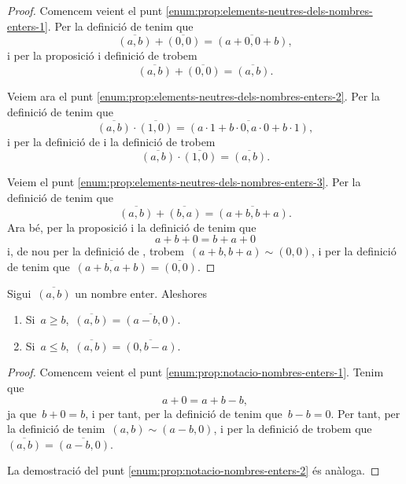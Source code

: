 \documentclass[../../main.tex]{subfiles}
\begin{document}
    \begin{proof}
        Comencem veient el punt \eqref{enum:prop:elements-neutres-dels-nombres-enters-1}.
        Per la definició de  tenim que
        \[
            \overline{(a,b)}+\overline{(0,0)}=\overline{(a+0,0+b)},
        \]
        i per la proposició  i definició de   trobem
        \[
            \overline{(a,b)}+\overline{(0,0)}=\overline{(a,b)}.
        \]

        Veiem ara el punt \eqref{enum:prop:elements-neutres-dels-nombres-enters-2}.
        Per la definició de  tenim que
        \[
            \overline{(a,b)}\cdot\overline{(1,0)}=\overline{(a\cdot 1+b\cdot 0,a\cdot0+b\cdot1)},
        \]
        i per la definició de  i la definició de  trobem
        \[
            \overline{(a,b)}\cdot\overline{(1,0)}=\overline{(a,b)}.
        \]

        Veiem el punt \eqref{enum:prop:elements-neutres-dels-nombres-enters-3}.
        Per la definició de  tenim que
        \[
            \overline{(a,b)}+\overline{(b,a)}=\overline{(a+b,b+a)}.
        \]
        Ara bé, per la proposició  i la definició de  tenim que
        \[
            a+b+0=b+a+0
        \]
        i, de nou per la definició de , trobem~\((a+b,b+a)\sim(0,0)\), i per la definició de  tenim que~\(\overline{(a+b,a+b)}=\overline{(0,0)}\).
    \end{proof}
    \begin{proposition}
        \label{prop:notacio-nombres-enters}
        Sigui~\(\overline{(a,b)}\) un nombre enter.
        Aleshores
        \begin{enumerate}
            \item\label{enum:prop:notacio-nombres-enters-1} Si~\(a\geq b\),~\(\overline{(a,b)}=\overline{(a-b,0)}\).
            \item\label{enum:prop:notacio-nombres-enters-2} Si~\(a\leq b\),~\(\overline{(a,b)}=\overline{(0,b-a)}\).
        \end{enumerate}
    \end{proposition}
    \begin{proof}
        Comencem veient el punt \eqref{enum:prop:notacio-nombres-enters-1}.
        Tenim que
        \[
            a+0=a+b-b,
        \]
        ja que~\(b+0=b\), i per tant, per la definició de  tenim que~\(b-b=0\).
        Per tant, per la definició de  tenim~\((a,b)\sim(a-b,0)\), i per la definició de  trobem que~\(\overline{(a,b)}=\overline{(a-b,0)}\).

        La demostració del punt \eqref{enum:prop:notacio-nombres-enters-2} és anàloga.
    \end{proof}
\end{document}
